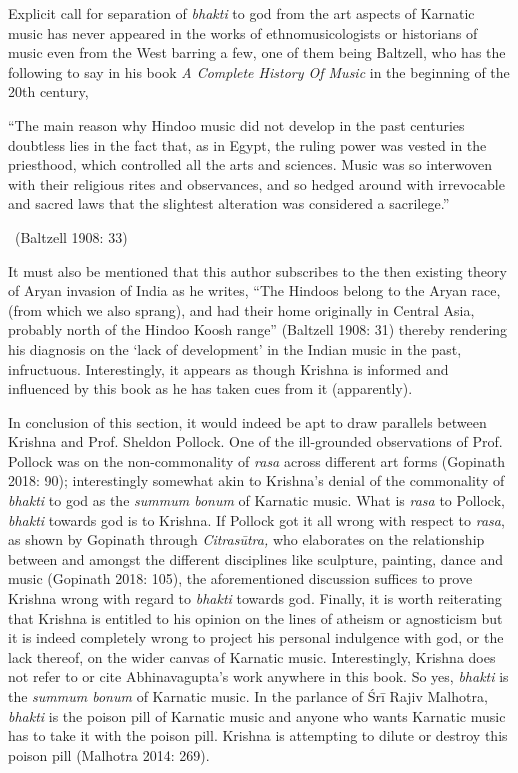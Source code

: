 Explicit call for separation of \textit{bhakti} to god from the art aspects of Karnatic music has never appeared in the works of ethnomusicologists or historians of music even from the West barring a few, one of them being Baltzell, who has the following to say in his book \textit{A Complete History Of Music} in the beginning of the 20th century,

\vspace{.1cm}

\begin{myquote}
“The main reason why Hindoo music did not develop in the past centuries doubtless lies in the fact that, as in Egypt, the ruling power was vested in the priesthood, which controlled all the arts and sciences. Music was so interwoven with their religious rites and observances, and so hedged around with irrevocable and sacred laws that the slightest alteration was considered a sacrilege.” 

~\hfill (Baltzell 1908: 33)
\end{myquote}

It must also be mentioned that this author subscribes to the then existing theory of Aryan invasion of India as he writes, “The Hindoos belong to the Aryan race, (from which we also sprang), and had their home originally in Central Asia, probably north of the Hindoo Koosh range” (Baltzell 1908: 31) thereby rendering his diagnosis on the ‘lack of development’ in the Indian music in the past, infructuous. Interestingly, it appears as though Krishna is informed and influenced by this book as he has taken cues from it (apparently).

In conclusion of this section, it would indeed be apt to draw parallels between Krishna and Prof. Sheldon Pollock. One of the ill-grounded observations of Prof. Pollock was on the non-commonality of \textit{rasa} across different art forms (Gopinath 2018: 90); interestingly somewhat akin to Krishna’s denial of the commonality of \textit{bhakti} to god as the \textit{summum bonum} of Karnatic music. What is \textit{rasa} to Pollock, \textit{bhakti} towards god is to Krishna. If Pollock got it all wrong with respect to \textit{rasa}, as shown by Gopinath through \textit{Citrasūtra, }who elaborates on the relationship between and amongst the different disciplines like sculpture, painting, dance and music (Gopinath 2018: 105), the aforementioned discussion suffices to prove Krishna wrong with regard to \textit{bhakti} towards god. Finally, it is worth reiterating that Krishna is entitled to his opinion on the lines of atheism or agnosticism but it is indeed completely wrong to project his personal indulgence with god, or the lack thereof, on the wider canvas of Karnatic music. Interestingly, Krishna does not refer to or cite Abhinavagupta’s work anywhere in this book. So yes, \textit{bhakti} is the \textit{summum bonum} of Karnatic music. In the parlance of Śrī Rajiv Malhotra, \textit{bhakti} is the poison pill of Karnatic music and anyone who wants Karnatic music has to take it with the poison pill. Krishna is attempting to dilute or destroy this poison pill (Malhotra 2014: 269).

